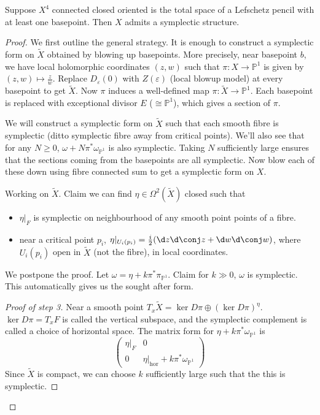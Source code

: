 \documentclass[a4paper]{article}
\renewcommand*{\P}{\mathbb{P}}
\begin{document}
\begin{theorem}
  Suppose \(X^4\) connected closed oriented is the total space of a Lefschetz pencil with at least one basepoint. Then \(X\) admits a symplectic structure.
\end{theorem}

\begin{proof}
  We first outline the general strategy. It is enough to construct a symplectic form on \(\tilde X\) obtained by blowing up basepoints. More precisely, near basepoint \(b\), we have local holomorphic coordinates \((z, w)\) such that \(\pi: X \to \P^1\) is given by \((z, w) \mapsto \frac{z}{w}\). Replace \(D_\varepsilon(0)\) with \(Z(\varepsilon)\) (local blowup model) at every basepoint to get \(\tilde X\). Now \(\pi\) induces a well-defined map \(\pi: \tilde X \to \P^1\). Each basepoint is replaced with exceptional divisor \(E\) (\(\cong \P^1\)), which gives a section of \(\pi\).

  We will construct a symplectic form on \(\tilde X\) such that each smooth fibre is symplectic (ditto symplectic fibre away from critical points). We'll also see that for any \(N \geq 0\), \(\omega + N \pi^* \omega_{\P^1}\) is also symplectic. Taking \(N\) sufficiently large ensures that the sections coming from the basepoints are all symplectic. Now blow each of these down using fibre connected sum to get a symplectic form on \(X\).

  Working on \(\tilde X\). Claim we can find \(\eta \in \Omega^2(\tilde X)\) closed such that
  \begin{itemize}
  \item \(\eta|_F\) is symplectic on neighbourhood of any smooth point points of a fibre.
  \item near a critical point \(p_i\), \(\eta|_{U_i(p_i)} = \frac{i}{2}(\d z \d \conj z + \d w \d \conj w)\), where \(U_i(p_i)\) open in \(\tilde X\) (not the fibre), in local coordinates.
  \end{itemize}

  We postpone the proof. Let \(\omega = \eta + k \pi^* \pi_{\P^1}\). Claim for \(k \gg 0\), \(\omega\) is symplectic. This automatically gives us the sought after form.

  \begin{proof}[Proof of step 3]
    Near a smooth point \(T_x \tilde X = \ker D\pi \oplus (\ker D\pi)^\eta\). \(\ker D\pi = T_xF\) is called the vertical subspace, and the symplectic complement is called a choice of horizontal space. The matrix form for \(\eta + k \pi^* \omega_{\P^1}\) is
    \[
      \begin{pmatrix}
        \eta|_F & 0 \\
        0 & \eta|_{\mathrm{hor}} + k \pi^* \omega_{\P^1}
      \end{pmatrix}
    \]
    Since \(\tilde X\) is compact, we can choose \(k\) sufficiently large such that the this is symplectic.


\end{proof}
\end{proof}
\end{document}
